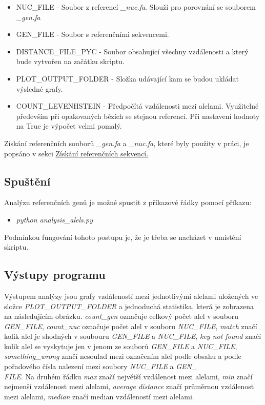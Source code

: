 \documentclass[czech,DP]{thesiskiv}
\numberwithin{equation}{section}
\begin{document}
\begin{itemize}
	\item NUC\_FILE - Soubor z referencí \textit{\_nuc.fa}. Slouží pro porovnání se souborem \textit{\_gen.fa}
	\item GEN\_FILE - Soubor s referenčními sekvencemi.
	\item DISTANCE\_FILE\_PYC - Soubor obsahující všechny vzdálenosti a který bude vytvořen na začátku skriptu.
	\item PLOT\_OUTPUT\_FOLDER - Složka udávající kam se budou ukládat výsledné grafy.
	\item COUNT\_LEVENHSTEIN - Předpočítá vzdálenosti mezi alelami. Využitelné především při opakovaných bězích se stejnou referencí. Při nastavení hodnoty na True je výpočet velmi pomalý.
\end{itemize}

\noindent
Získání referenčních souborů \textit{\_gen.fa} a \textit{\_nuc.fa}, které byly použity v práci, je popsáno v sekci  \hyperref[sec:ref_sek]{Získání referenčních sekvencí.}

\subsection{Spuštění}
Analýzu referenčních genů je možné spustit z příkazové řádky pomocí příkazu:
\begin{itemize}
 \item \colorbox{gray!15}{\textit{python analysis\_alels.py}}
\end{itemize}

\noindent
Podmínkou fungování tohoto postupu je, že je třeba se nacházet v umístění skriptu. 

\subsection{Výstupy programu}
Výstupem analýzy jsou grafy vzdáleností mezi jednotlivými alelami uložených ve složce \textit{PLOT\_OUTPUT\_FOLDER} a jednoduchá statistika, která je zobrazena na následujícím obrázku. \textit{count\_gen} označuje celkový počet alel v souboru \textit{GEN\_FILE}, \textit{count\_nuc} označuje počet alel v souboru \textit{NUC\_FILE}, \textit{match} značí kolik alel je shodných v soubouru \textit{GEN\_FILE} a \textit{NUC\_FILE}, \textit{key not found} značí kolik alel se vyskytuje jen v jenom ze souborů \textit{GEN\_FILE} a \textit{NUC\_FILE}, \textit{something\_wrong} značí nesoulad mezi označením alel podle obsahu a podle pořadového čísla nalezení mezi soubory \textit{NUC\_FILE} a \textit{GEN\_ \\ FILE}. Na druhém řádku \textit{max} značí největší vzdálenost mezi alelami, \textit{min} značí nejmenší vzdálenost mezi alelami, \textit{average distance} značí průměrnou vzdálenost mezi alelami, \textit{median} značí median vzdáleností mezi alelami.
\end{document}
